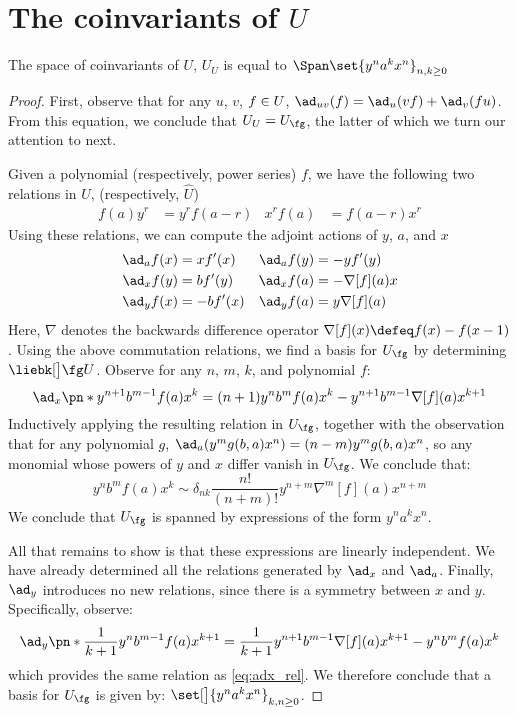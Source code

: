 \documentclass{article}
\begin{document}
\section{The coinvariants of $U$}

\begin{theorem}
        The space of coinvariants of $U$, $U_U$ is equal to
        $\Span\set{y^n a^k x^n}_{n, k\ge 0}$
\end{theorem}
\begin{proof}
First, observe that for any $u$, $v$, $f\in U$,
$\ad_{uv}(f) = \ad_u(vf) + \ad_v(fu)$. From this equation, we conclude that
$\CU_\CU = \CU_\Alg$, the latter of which we turn our attention to next.

Given a polynomial (respectively, power series) $f$, we have the following two
relations in $U$, (respectively, $\widehat U$)
\begin{align}
        f(a)y^r &= y^rf(a-r) &
        x^rf(a) &= f(a-r)x^r
\end{align}
Using these relations, we can compute the adjoint actions of $y$, $a$, and $x$
\begin{align}
  \ad_a f(x) &= xf'(x)&
  \ad_a f(y) &= -yf'(y)\label{eq:ada}\\
  \ad_x f(y) &= bf'(y) &
  \ad_x f(a) &= -\nabla[f](a)x\label{eq:adx}\\
  \ad_y f(x) &= -bf'(x) &
  \ad_y f(a) &= y\nabla[f](a)\label{eq:ady}
\end{align}
Here, $\nabla$ denotes the backwards difference operator $\nabla[f](x) \defeq
f(x) - f(x-1)$. Using the above commutation relations, we find a basis for
$U_{\fg}$ by determining $\liebk[\big] \fg U$. Observe for any $n$, $m$, $k$,
and polynomial $f$:
\begin{equation}\label{eq:adx_rel}
\ad_{x}\pn*{y^{n+1}b^{m-1}f(a)x^{k}} =
(n+1)y^{n}b^{m}f(a)x^{k} - y^{n+1}b^{m-1}\nabla[f](a)x^{k+1}
\end{equation}
Inductively applying the resulting relation in $U_{\fg}$, together with the
observation that for any polynomial $g$,
$\ad_a (y^m g(b, a) x^n ) = (n-m)y^mg(b, a) x^n$,
so any monomial whose powers of $y$ and $x$ differ vanish in $\CU_{\Alg}$. We
conclude that:
\begin{equation}
        y^n b^m f(a) x^k \sim δ_{nk}\frac{n!}{(n+m)!}y^{n+m}\nabla^m[f](a)x^{n+m}
\end{equation}
We conclude that $\CU_{\Alg}$ is spanned by expressions of the form
$y^n a^k x^n$.

All that remains to show is that these expressions are linearly independent. We
have already determined all the relations generated by $\ad_x$ and $\ad_a$.
Finally, $\ad_y$ introduces no new relations, since there is a symmetry between
$x$ and $y$. Specifically, observe:
\begin{equation}
        \ad_y\pn*{
                \frac1{k+1}y^n b^{m-1} f(a) x^{k+1}
        }
        =\frac1{k+1} y^{n+1} b^{m-1} \nabla[f](a)x^{k+1} - y^n b^m f(a) x^k
\end{equation}
which provides the same relation as \cref{eq:adx_rel}. We therefore conclude
that a basis for $\CU_{\Alg}$ is given by:
$\set[\big]{y^n a^k x^n}_{k, n \ge 0}$.
\end{proof}
\end{document}
